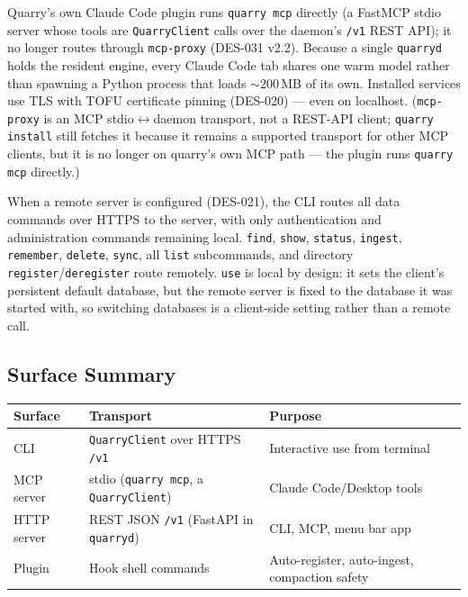 \documentclass[a4paper,10pt]{article}
\begin{document}
Quarry's own Claude Code plugin runs \texttt{quarry mcp} directly (a
FastMCP stdio server whose tools are \texttt{QuarryClient} calls over the
daemon's \texttt{/v1} REST API); it no longer routes through
\texttt{mcp-proxy} (DES-031 v2.2).  Because a single \texttt{quarryd}
holds the resident engine, every Claude Code tab shares one warm model
rather than spawning a Python process that loads $\sim$200\,MB of its
own.  Installed services use TLS with TOFU certificate pinning (DES-020)
--- even on localhost.  (\texttt{mcp-proxy} is an MCP stdio$\leftrightarrow$daemon
transport, not a REST-API client; \texttt{quarry install} still fetches it
because it remains a supported transport for other MCP clients, but it is
no longer on quarry's own MCP path --- the plugin runs \texttt{quarry mcp}
directly.)

When a remote server is configured (DES-021), the CLI routes
all data commands over HTTPS to the server, with only authentication
and administration commands remaining local.  \texttt{find},
\texttt{show}, \texttt{status}, \texttt{ingest}, \texttt{remember},
\texttt{delete}, \texttt{sync}, all \texttt{list} subcommands, and
directory \texttt{register}/\texttt{deregister} route remotely.
\texttt{use} is local by design: it sets the client's persistent default
database, but the remote server is fixed to the database it was started
with, so switching databases is a client-side setting rather than a
remote call.

\subsection{Surface Summary}

\begin{center}
\begin{tabular}{llp{7cm}}
\toprule
\textbf{Surface} & \textbf{Transport} & \textbf{Purpose} \\
\midrule
CLI         & \texttt{QuarryClient} over HTTPS \texttt{/v1} & Interactive use from terminal \\
MCP server  & stdio (\texttt{quarry mcp}, a \texttt{QuarryClient}) & Claude Code/Desktop tools \\
HTTP server & REST JSON \texttt{/v1} (FastAPI in \texttt{quarryd}) & CLI, MCP, menu bar app \\
Plugin      & Hook shell commands  & Auto-register, auto-ingest, compaction safety \\
\bottomrule
\end{tabular}
\end{center}
\end{document}
